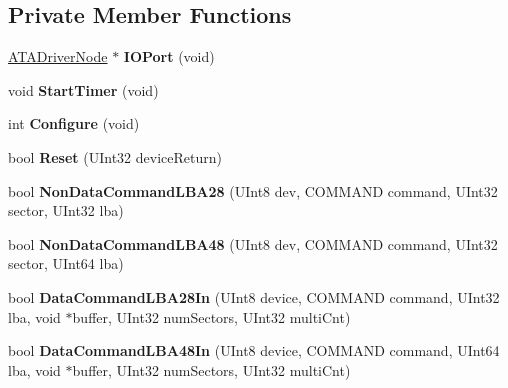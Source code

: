 \subsection*{Private Member Functions}
\begin{DoxyCompactItemize}
\item 
\mbox{\label{class_a_t_a_driver_ad3d6512578f1cbb9227bde5e9ecbc7e7}} 
\hyperlink{class_a_t_a_driver_node}{A\+T\+A\+Driver\+Node} $\ast$ {\bfseries I\+O\+Port} (void)
\item 
\mbox{\label{class_a_t_a_driver_a59a29742ad53b92cc30109ec06b4e994}} 
void {\bfseries Start\+Timer} (void)
\item 
\mbox{\label{class_a_t_a_driver_a49229a68f9dc58114d54246bdc0a7ae5}} 
int {\bfseries Configure} (void)
\item 
\mbox{\label{class_a_t_a_driver_adb2eadde039bbfc3f1e8dba326ce61c2}} 
bool {\bfseries Reset} (U\+Int32 device\+Return)
\item 
\mbox{\label{class_a_t_a_driver_a877c90a14c27f0bd4c2fbbd29236e5af}} 
bool {\bfseries Non\+Data\+Command\+L\+B\+A28} (U\+Int8 dev, C\+O\+M\+M\+A\+ND command, U\+Int32 sector, U\+Int32 lba)
\item 
\mbox{\label{class_a_t_a_driver_a8cb0839e7e217848aa085c151cbbdb48}} 
bool {\bfseries Non\+Data\+Command\+L\+B\+A48} (U\+Int8 dev, C\+O\+M\+M\+A\+ND command, U\+Int32 sector, U\+Int64 lba)
\item 
\mbox{\label{class_a_t_a_driver_a4c141442bc319326e9a5b0439e4b75af}} 
bool {\bfseries Data\+Command\+L\+B\+A28\+In} (U\+Int8 device, C\+O\+M\+M\+A\+ND command, U\+Int32 lba, void $\ast$buffer, U\+Int32 num\+Sectors, U\+Int32 multi\+Cnt)
\item 
\mbox{\label{class_a_t_a_driver_a72ed03e250b408a87449e98062ca8743}} 
bool {\bfseries Data\+Command\+L\+B\+A48\+In} (U\+Int8 device, C\+O\+M\+M\+A\+ND command, U\+Int64 lba, void $\ast$buffer, U\+Int32 num\+Sectors, U\+Int32 multi\+Cnt)
\item 
\mbox{\label{class_a_t_a_driver_aa9b2e4ca088d4a8fcd91225d49bef47e}} 

\end{DoxyCompactItemize}
